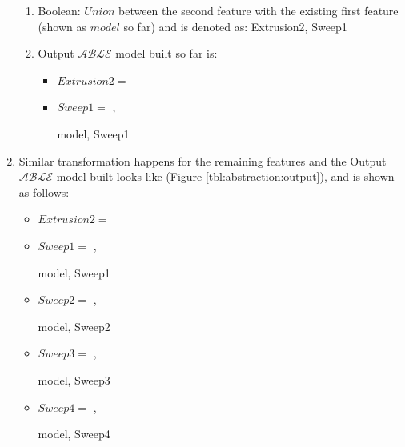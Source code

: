 \begin{enumerate}
\begin{enumerate}
	\item Boolean: $Union$ between the second feature with the existing first feature (shown as $model$ so far) and is denoted as: 
	 {Extrusion2, Sweep1} 	
	\item Output  $\mathcal{ABLE}$ model built so far is:
	
		\begin{itemize}[noitemsep,topsep=2pt,parsep=2pt,partopsep=2pt,label={+}]
		\item  $Extrusion2 =$ 
		\item  $Sweep1 =$  ,
		
			 {model, Sweep1} 
		\end{itemize}	
	\end{enumerate}

\item 	Similar transformation happens for the remaining features and the Output  $\mathcal{ABLE}$ model built looks like (Figure \ref{tbl:abstraction:output}), and is shown as follows:
		\begin{itemize}[noitemsep,topsep=2pt,parsep=2pt,partopsep=2pt,label={+}]
		\item  $Extrusion2 =$ 
		\item  $Sweep1 =$  ,
		
			 {model, Sweep1} 
		\item  $Sweep2 =$  ,
		
			 {model, Sweep2} 	
		\item  $Sweep3 =$  ,
		
			 {model, Sweep3} 
		\item  $Sweep4 =$  ,
		
			 {model, Sweep4} 					
		\end{itemize}	
\end{enumerate}

\bigskip

